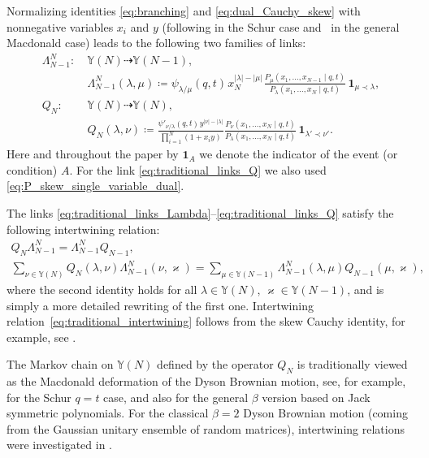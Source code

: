 \documentclass[pdftex]{sigma}
\numberwithin{equation}{section}
\begin{document}
Normalizing identities
\eqref{eq:branching} and \eqref{eq:dual_Cauchy_skew}
with nonnegative variables $x_i$ and $y$
(following
\cite{Borodin2010Schur,BorFerr2008DF} in the Schur case and~\cite{BorodinCorwin2011Macdonald}
in the general Macdonald case)
leads to the following two families of links:
\begin{align}
\Lambda^{N}_{N-1}\colon \ & \mathbb{Y}(N)\dashrightarrow \mathbb{Y}(N-1),
		\nonumber\\
		& \Lambda^{N}_{N-1}(\lambda,\mu)\coloneqq
		\psi_{\lambda/\mu}(q,t)\hspace{1pt} x_N^{|\lambda|-|\mu|}\hspace{1pt}
		\frac{
		P_\mu(x_1,\dots,x_{N-1} \mid q,t )
		}
		{P_\lambda(x_1,\dots,x_N \mid q,t)}
		\,\mathbf{1}_{\mu\prec\lambda},\label{eq:traditional_links_Lambda}\\
Q_N\colon \ & \mathbb{Y}(N)\dashrightarrow \mathbb{Y}(N),
		\nonumber\\
		& Q_N(\lambda,\nu)\coloneqq
		\frac{\psi'_{\nu/\lambda}(q,t)
		\hspace{1pt}
		y^{|\nu|-|\lambda|}
		}
		{\prod_{i=1}^{N}(1+x_i y)}
		\frac
		{
		P_\nu(x_1,\dots,x_N\mid q,t )}
		{P_\lambda(x_1,\dots,x_N\mid q,t )}
		\,\mathbf{1}_{\lambda'\prec\nu'}		.\label{eq:traditional_links_Q}
\end{align}
Here and
throughout the paper by $\mathbf{1}_{A}$ we denote
the indicator of the event (or condition) $A$.
For the link \eqref{eq:traditional_links_Q}
we also used \eqref{eq:P_skew_single_variable_dual}.

The links \eqref{eq:traditional_links_Lambda}--\eqref{eq:traditional_links_Q}
satisfy the following intertwining
relation:
\begin{gather}
	Q_N
	\Lambda^{N}_{N-1}
	=
	\Lambda^{N}_{N-1}
	Q_{N-1}
	,\nonumber\\
	\sum_{\nu\in \mathbb{Y}(N)}
	Q_N(\lambda,\nu)
	\Lambda^{N}_{N-1}(\nu,\varkappa)
	=
	\sum_{\mu\in \mathbb{Y}(N-1)}
	\Lambda^{N}_{N-1}(\lambda,\mu)
	Q_{N-1}(\mu,\varkappa)
	,\label{eq:traditional_intertwining}
\end{gather}
where the second identity holds for all $\lambda\in \mathbb{Y}(N)$,
$\varkappa\in \mathbb{Y}(N-1)$,
and is simply a more detailed rewriting of the first one.
Intertwining relation~\eqref{eq:traditional_intertwining}
follows from the skew Cauchy identity,
for example, see \cite[Proposition~2.3.1]{BorodinCorwin2011Macdonald}.

The Markov chain on $\mathbb{Y}(N)$ defined by the operator
$Q_N$ is traditionally viewed
as the
Macdonald deformation of the
Dyson Brownian motion, see, for example,
\cite{BorFerr2008DF, GorinShkolnikov2012}
for the Schur $q=t$ case, and also
\cite{GorinShkolnikov2014} for the general $\beta$ version
based on Jack symmetric polynomials.
For the classical $\beta=2$ Dyson Brownian motion (coming from the
Gaussian unitary ensemble of random matrices),
intertwining relations were investigated in \cite{warren2005dyson}.
\end{document}
